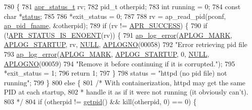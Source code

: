 \begin{DoxyCode}
780 \{
781     \hyperlink{group__apr__errno_gaa5105fa83cc322f09382292db8b47593}{apr\_status\_t} rv;
782     pid\_t otherpid;
783     \textcolor{keywordtype}{int} running = 0;
784     \textcolor{keyword}{const} \textcolor{keywordtype}{char} *\hyperlink{group__APACHE__CORE__HTTPD_ga6e27f49150e9a14580fb313cc2777e00}{status};
785 
786     *exit\_status = 0;
787 
788     rv = ap\_read\_pid(pconf, \hyperlink{group__APACHE__MPM_ga4bb083f6085cef22dd8d12343eea4328}{ap\_pid\_fname}, &otherpid);
789     \textcolor{keywordflow}{if} (rv != \hyperlink{group__apr__errno_ga9ee311b7bf1c691dc521d721339ee2a6}{APR\_SUCCESS}) \{
790         \textcolor{keywordflow}{if} (!\hyperlink{group__APR__STATUS__IS_gad15c3b9bda78a88c02466a0d405c6047}{APR\_STATUS\_IS\_ENOENT}(rv)) \{
791             \hyperlink{group__APACHE__CORE__LOG_ga5e6676c87418af7a1d323a116c78ecb4}{ap\_log\_error}(\hyperlink{group__APACHE__CORE__LOG_ga655e126996849bcb82e4e5a14c616f4a}{APLOG\_MARK}, \hyperlink{group__APACHE__CORE__LOG_ga39efd19b052fb6f39d8f263c16cc82b7}{APLOG\_STARTUP}, rv, 
      \hyperlink{pcre_8txt_ad7f989d16aa8ca809a36bc392c07fba1}{NULL}, \hyperlink{group__APACHE__CORE__LOG_ga1dee8a07e06bc5b3de8b89662c2cd666}{APLOGNO}(00058)
792                          \textcolor{stringliteral}{"Error retrieving pid file %
793             \hyperlink{group__APACHE__CORE__LOG_ga5e6676c87418af7a1d323a116c78ecb4}{ap\_log\_error}(\hyperlink{group__APACHE__CORE__LOG_ga655e126996849bcb82e4e5a14c616f4a}{APLOG\_MARK}, \hyperlink{group__APACHE__CORE__LOG_ga39efd19b052fb6f39d8f263c16cc82b7}{APLOG\_STARTUP}, 0, 
      \hyperlink{pcre_8txt_ad7f989d16aa8ca809a36bc392c07fba1}{NULL}, \hyperlink{group__APACHE__CORE__LOG_ga1dee8a07e06bc5b3de8b89662c2cd666}{APLOGNO}(00059)
794                          \textcolor{stringliteral}{"Remove it before continuing if it is corrupted."});
795             *exit\_status = 1;
796             \textcolor{keywordflow}{return} 1;
797         \}
798         status = \textcolor{stringliteral}{"httpd (no pid file) not running"};
799     \}
800     \textcolor{keywordflow}{else} \{
801         \textcolor{comment}{/* With containerization, httpd may get the same PID at each startup,}
802 \textcolor{comment}{         * handle it as if it were not running (it obviously can't).}
803 \textcolor{comment}{         */}
804         \textcolor{keywordflow}{if} (otherpid != \hyperlink{group__APACHE__OS__NETWARE_gacf2940fe9f29eb438f40629fd4fbb2b6}{getpid}() && kill(otherpid, 0) == 0) \{
}
\end{DoxyCode}
